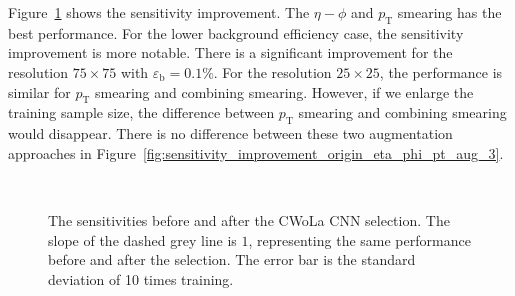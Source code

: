 \documentclass[12pt]{article}
\begin{document}
        Figure~\ref{fig:sensitivity_improvement_origin_eta_phi_pt_aug_1} shows the sensitivity improvement. The $\eta-\phi$ and $p_{\text{T}}$ smearing has the best performance. For the lower background efficiency case, the sensitivity improvement is more notable. There is a significant improvement for the resolution $75\times 75$ with $\varepsilon_{\text{b}} = 0.1\%$. For the resolution $25\times 25$, the performance is similar for $p_{\text{T}}$ smearing and combining smearing. However, if we enlarge the training sample size, the difference between $p_{\text{T}}$ smearing and combining smearing would disappear. There is no difference between these two augmentation approaches in Figure~\ref{fig:sensitivity_improvement_origin_eta_phi_pt_aug_3}.
        \begin{figure}[htpb]
            \centering
             \\
            \caption{The sensitivities before and after the CWoLa CNN selection. The slope of the dashed grey line is $1$, representing the same performance before and after the selection. The error bar is the standard deviation of 10 times training.}
            \label{fig:sensitivity_improvement_origin_eta_phi_pt_aug_1}
        \end{figure}
\end{document}
